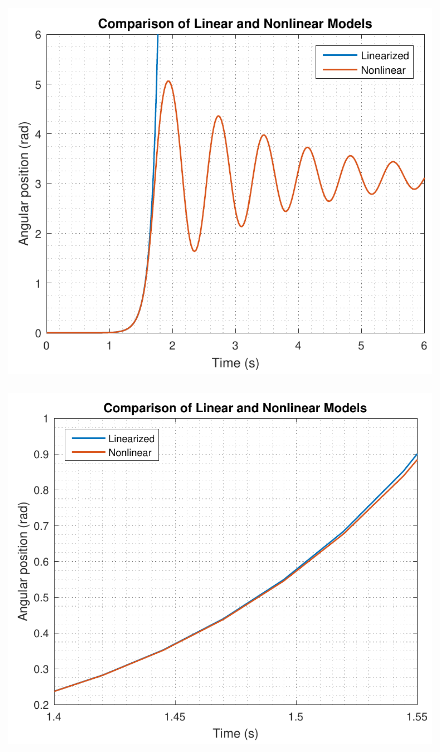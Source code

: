 \begin{minipage}{\linewidth}
  \begin{minipage}{0.5\linewidth}
    \begin{figure}[H]
    	\includegraphics[scale=.5]{figures/LinearizedVSNonlinear}
    	\centering
  		\captionsetup{justification=centering}
  		\label{LinearizedVSNonlinear}
  	\end{figure}
  \end{minipage}
  \begin{minipage}{0.5\linewidth}
  	\begin{figure}[H]%
  		\includegraphics[scale=.5]{figures/LinearizedVSNonlinearZoom}
  		\centering
  		\captionsetup{justification=centering}
  		\label{LinearizedVSNonlinearZoom}
  	\end{figure}
  \end{minipage}
\end{minipage}


